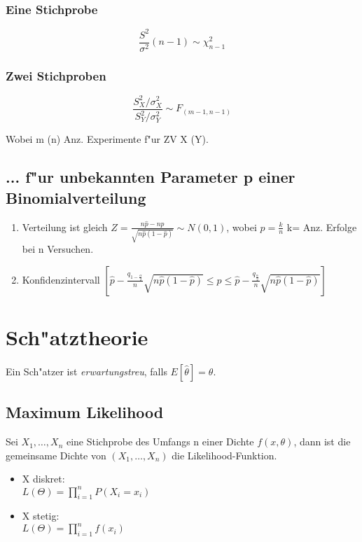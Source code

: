 \documentclass[10pt, a4paper, twocolumn]{scrartcl}
\begin{document}
\subsubsection{Eine Stichprobe}

$$\frac{S^2}{\sigma^2}(n-1)\sim \chi^2_{n-1}$$

\subsubsection{Zwei Stichproben}

$$\frac{S_X^2/\sigma_X^2}{S_Y^2/\sigma_Y^2}\sim F_{(m-1,n-1)}$$

Wobei m (n) Anz. Experimente f"ur ZV X (Y).

\subsection{... f"ur unbekannten Parameter p einer Binomialverteilung}

\begin{enumerate}
 \item Verteilung ist gleich $Z=\frac{n\hat{p}-np}{\sqrt{n\hat{p}(1-\hat{p})}}\sim N(0,1)$, wobei $\hat{p}=\frac{k}{n}$ k= Anz. Erfolge bei n Versuchen.
 \item Konfidenzintervall
  $[\hat{p}-\frac{q_{1-\frac{\alpha}{2}}}{n}\sqrt{n\hat{p}(1-\hat{p})} \leq p \leq \hat{p}-\frac{q_{\frac{\alpha}{2}}}{n}\sqrt{n\hat{p}(1-\hat{p})}]$
\end{enumerate}


\section{Sch"atztheorie}

Ein Sch"atzer ist \textit{erwartungstreu}, falls $E[\hat{\theta}]=\theta$.

\subsection{Maximum Likelihood}

Sei $X_1,\ldots,X_n$ eine Stichprobe des Umfangs n einer Dichte $f(x,\theta)$, dann ist die gemeinsame Dichte von $(X_1,\ldots,X_n)$ die Likelihood-Funktion.
\begin{itemize}
 \item X diskret:\\
  $L(\Theta)=\prod\limits^n_{i=1}P(X_i=x_i)$
 \item X stetig:\\
  $L(\Theta)=\prod\limits^n_{i=1}f(x_i)$
\end{itemize}
\end{document}
